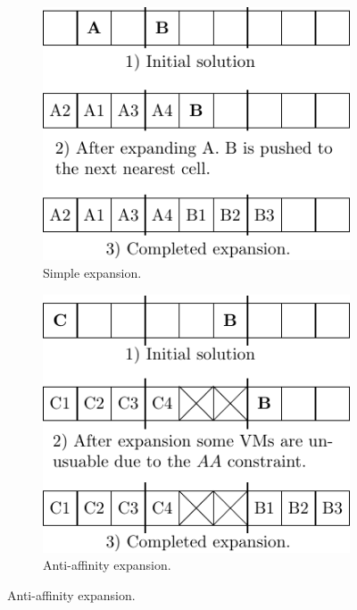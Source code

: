 \begin{figure}[t!]
	\begin{subfigure}[T]{.3\linewidth}
		\centering
		\includegraphics[width=\columnwidth]{figures/simple_expansion-crop}
		\caption{Simple expansion.}
		\label{fig:1a}
	\end{subfigure}\hfil
	\begin{subfigure}[T]{.3\linewidth}
		\centering
		\includegraphics[width=\columnwidth]{figures/aa_expansion-crop}
		\caption{Anti-affinity expansion.}
		\label{fig:1b}
	\end{subfigure}\hfil

\end{figure}
